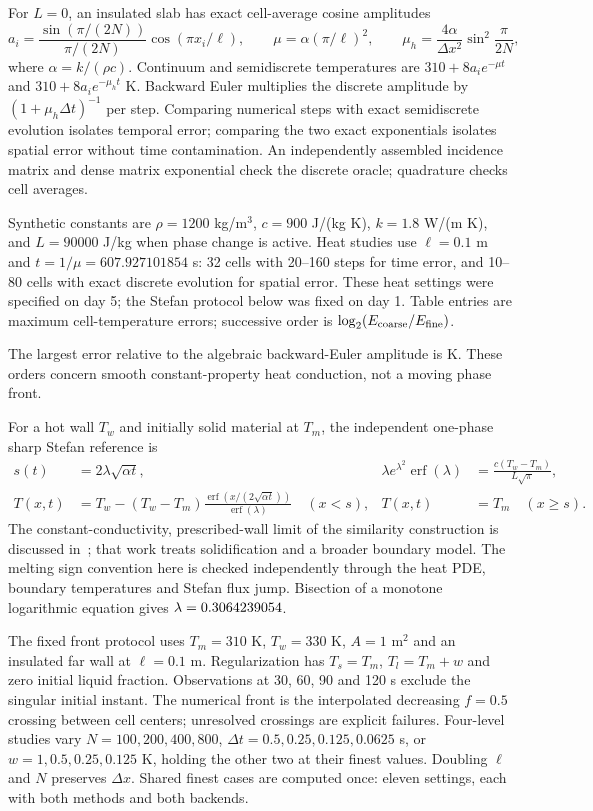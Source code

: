 \documentclass[10pt,a4paper]{article}
\begin{document}
For $L=0$, an insulated slab has exact cell-average cosine amplitudes
\begin{equation}
a_i=\frac{\sin(\pi/(2N))}{\pi/(2N)}\cos(\pi x_i/\ell),\qquad
\mu=\alpha(\pi/\ell)^2,\qquad
\mu_h=\frac{4\alpha}{\Delta x^2}\sin^2\frac{\pi}{2N},
\end{equation}
where $\alpha=k/(\rho c)$. Continuum and semidiscrete temperatures are
$310+8a_i e^{-\mu t}$ and $310+8a_i e^{-\mu_ht}$ K. Backward Euler
multiplies the discrete amplitude by $(1+\mu_h\Delta t)^{-1}$ per step.
Comparing numerical steps with exact semidiscrete evolution isolates temporal
error; comparing the two exact exponentials isolates spatial error without
time contamination. An independently assembled incidence matrix and dense
matrix exponential check the discrete oracle; quadrature checks cell averages.

Synthetic constants are $\rho=1200$ kg/m$^3$, $c=900$ J/(kg K),
$k=1.8$ W/(m K), and $L=90000$ J/kg when phase change is active.
Heat studies use $\ell=0.1$ m and $t=1/\mu=607.927101854$ s: 32 cells with
20--160 steps for time error, and 10--80 cells with exact discrete evolution
for spatial error. These heat settings were specified on day 5; the Stefan
protocol below was fixed on day 1. Table entries are maximum cell-temperature
errors; successive order is $\log_2(E_{\rm coarse}/E_{\rm fine})$.

The largest error relative to the algebraic backward-Euler amplitude is
\texttt{\HeatAlgebraic} K. These orders concern smooth constant-property
heat conduction, not a moving phase front.

For a hot wall $T_w$ and initially solid material at $T_m$, the independent
one-phase sharp Stefan reference is
\begin{align}
s(t)&=2\lambda\sqrt{\alpha t},&
\lambda e^{\lambda^2}\operatorname{erf}(\lambda)
 &=\frac{c(T_w-T_m)}{L\sqrt{\pi}},\\
T(x,t)&=T_w-(T_w-T_m)
\frac{\operatorname{erf}(x/(2\sqrt{\alpha t}))}{\operatorname{erf}(\lambda)}
\quad(x<s),&
T(x,t)&=T_m\quad(x\ge s).
\end{align}
The constant-conductivity, prescribed-wall limit of the similarity
construction is discussed in~\cite{ceretani}; that work treats solidification
and a broader boundary model. The melting sign convention here is checked
independently through the heat PDE, boundary temperatures and Stefan flux jump.
Bisection of a monotone logarithmic equation gives $\lambda=0.3064239054$.

The fixed front protocol uses $T_m=310$ K, $T_w=330$ K, $A=1$ m$^2$ and an
insulated far wall at $\ell=0.1$ m. Regularization has $T_s=T_m$, $T_l=T_m+w$
and zero initial liquid fraction. Observations at 30, 60, 90 and 120 s exclude
the singular initial instant. The numerical front is the interpolated
decreasing $f=0.5$ crossing between cell centers; unresolved crossings are
explicit failures. Four-level studies vary $N=100,200,400,800$,
$\Delta t=0.5,0.25,0.125,0.0625$ s, or $w=1,0.5,0.25,0.125$ K, holding the
other two at their finest values. Doubling $\ell$ and $N$ preserves $\Delta x$.
Shared finest cases are computed once: eleven settings, each with both
methods and both backends.
\end{document}
